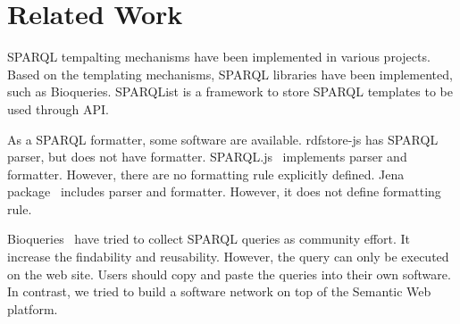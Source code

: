\documentclass[runningheads]{llncs}
\begin{document}



\section{Related Work}

SPARQL tempalting mechanisms have been implemented in various projects. Based on the templating mechanisms, SPARQL libraries have been implemented, such as Bioqueries. SPARQList is a framework to store SPARQL templates to be used through API.

As a SPARQL formatter, some software are available.
rdfstore-js\cite{rdfstore-js} has SPARQL parser, but does not have formatter.
SPARQL.js~\cite{sparql-js} implements parser and formatter. However, there are no formatting rule explicitly defined.
Jena package~\cite{jena} includes parser and formatter. However, it does not define formatting rule.

Bioqueries~\cite{bioqueries} have tried to collect SPARQL queries as community effort. It increase the findability and reusability.
However, the query can only be executed on the web site.
Users should copy and paste the queries into their own software.
In contrast, we tried to build a software network on top of the Semantic Web platform.
\end{document}
